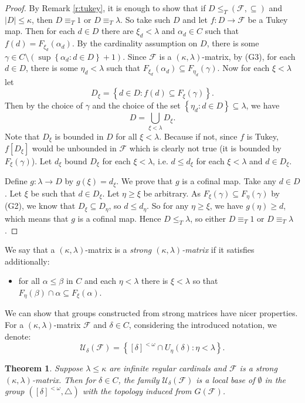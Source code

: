 \documentclass{amsart}
\theoremstyle{plain}
\newtheorem{theorem}{Theorem}[section]
\theoremstyle{definition}
\numberwithin{equation}{section}
\renewcommand{\a}{\alpha}
\renewcommand{\b}{\beta}
\newcommand{\g}{\gamma}
\renewcommand{\d}{\delta}
\renewcommand{\k}{\kappa}
\renewcommand{\o}{\omega}
\renewcommand{\l}{\lambda}
\newcommand{\ps}{\emptyset}
\newcommand{\sst}{\subseteq}
\newcommand{\cu}{\mathcal U}
\newcommand{\set}[1]{\left\{#1\right\}}
\newcommand{\abs}[1]{\left\vert#1\right\vert}
\begin{document}
\begin{proof}
	By Remark \ref{r:tukey}, it is enough to show that if $D\le_T (\mathcal F,\sst)$ and $\abs{D}\le\k$, then $D\equiv_T 1$ or $D\equiv_T \l$.
	So take such $D$ and let $f:D\to \mathcal F$ be a Tukey map.
	Then for each $d \in D$ there are $\xi_d < \l$ and $\a_d \in C$ such that $f(d) = F_{\xi_d}(\a_d)$.
	By the cardinality assumption on $D$, there is some $\g\in C\setminus \left(\sup\set{\a_d:d\in D}+1\right)$.
	Since $\mathcal F$ is a $(\k,\l)$-matrix, by (G3), for each $d\in D$, there is some $\eta_d<\l$ such that $F_{\xi_d}(\a_d)\sst F_{\eta_d}(\g)$.
	Now for each $\xi<\l$ let $$D_{\xi}=\set{d\in D:f(d)\sst F_{\xi}(\g)}.$$
	Then by the choice of $\g$ and the choice of the set $\set{\eta_d:d\in D}\sst\l$, we have $$\textstyle D=\bigcup_{\xi<\l}D_{\xi}.$$
	Note that $D_{\xi}$ is bounded in $D$ for all $\xi<\l$.
	Because if not, since $f$ is Tukey, $f[D_{\xi}]$ would be unbounded in $\mathcal F$ which is clearly not true (it is bounded by $F_{\xi}(\g)$).
	Let $d_{\xi}$ bound $D_{\xi}$ for each $\xi<\l$, i.e. $d\le d_{\xi}$ for each $\xi<\l$ and $d\in D_{\xi}$.
	
	Define $g:\l\to D$ by $g(\xi)=d_{\xi}$.
	We prove that $g$ is a cofinal map.
	Take any $d\in D$.
	Let $\xi$ be such that $d\in D_{\xi}$.
	Let $\eta\ge\xi$ be arbitrary.
	As $F_{\xi}(\g)\sst F_{\eta}(\g)$ by (G2), we know that $D_{\xi}\sst D_{\eta}$, so $d\le d_{\eta}$.
	So for any $\eta\ge \xi$, we have $g(\eta)\ge d$, which means that $g$ is a cofinal map.
    Hence $D\le_T \l$, so either $D\equiv_T 1$ or $D\equiv_T \l$.
\end{proof}

We say that a $(\k,\l)$-matrix is a \emph{strong $(\k,\l)$-matrix} if it satisfies additionally:
\begin{itemize}
	\item[(G4)] for all $\a\le\b$ in $C$ and each $\eta<\l$ there is $\xi<\l$ so that $F_{\eta}(\b)\cap \a\sst F_{\xi}(\a)$.
\end{itemize}
We can show that groups constructed from strong matrices have nicer properties.
For a $(\k,\l)$-matrix $\mathcal F$ and $\d\in C$, considering the introduced notation, we denote: $$\cu_{\d}(\mathcal F)=\set{[\d]^{<\o}\cap U_{\eta}(\d):\eta<\l}.$$

\begin{theorem}\label{t:smallcharacter}
    Suppose $\l\le\k$ are infinite regular cardinals and $\mathcal F$ is a strong $(\k,\l)$-matrix.
	Then for $\d\in C$, the family $\cu_{\d}(\mathcal F)$ is a local base of $\ps$ in the group $([\d]^{<\o}, \triangle)$ with the topology induced from $G(\mathcal F)$.
\end{theorem}
\end{document}
